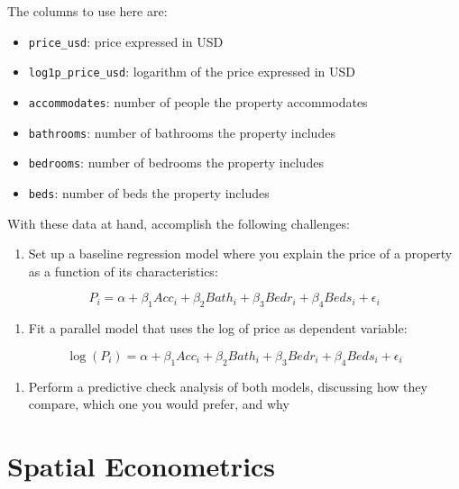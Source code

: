 \documentclass[
  letterpaper,
  DIV=11,
  numbers=noendperiod,
  oneside]{scrreprt}
\providecommand{\tightlist}{%
  \setlength{\itemsep}{0pt}\setlength{\parskip}{0pt}}\usepackage{longtable,booktabs,array}
\begin{document}
The columns to use here are:

\begin{itemize}
\tightlist
\item
  \texttt{price\_usd}: price expressed in USD
\item
  \texttt{log1p\_price\_usd}: logarithm of the price expressed in USD
\item
  \texttt{accommodates}: number of people the property accommodates
\item
  \texttt{bathrooms}: number of bathrooms the property includes
\item
  \texttt{bedrooms}: number of bedrooms the property includes
\item
  \texttt{beds}: number of beds the property includes
\end{itemize}

With these data at hand, accomplish the following challenges:

\begin{enumerate}
\def\labelenumi{\arabic{enumi}.}
\tightlist
\item
  Set up a baseline regression model where you explain the price of a
  property as a function of its characteristics:
\end{enumerate}

\[
P_i = \alpha + \beta_1 Acc_i + \beta_2 Bath_i + \beta_3 Bedr_i + \beta_4 Beds_i + \epsilon_i
\]

\begin{enumerate}
\def\labelenumi{\arabic{enumi}.}
\setcounter{enumi}{1}
\tightlist
\item
  Fit a parallel model that uses the log of price as dependent variable:
\end{enumerate}

\[
\log(P_i) = \alpha + \beta_1 Acc_i + \beta_2 Bath_i + \beta_3 Bedr_i + \beta_4 Beds_i + \epsilon_i
\]

\begin{enumerate}
\def\labelenumi{\arabic{enumi}.}
\setcounter{enumi}{2}
\tightlist
\item
  Perform a predictive check analysis of both models, discussing how
  they compare, which one you would prefer, and why
\end{enumerate}


\chapter{Spatial Econometrics}\label{sec-chp6}
\end{document}
